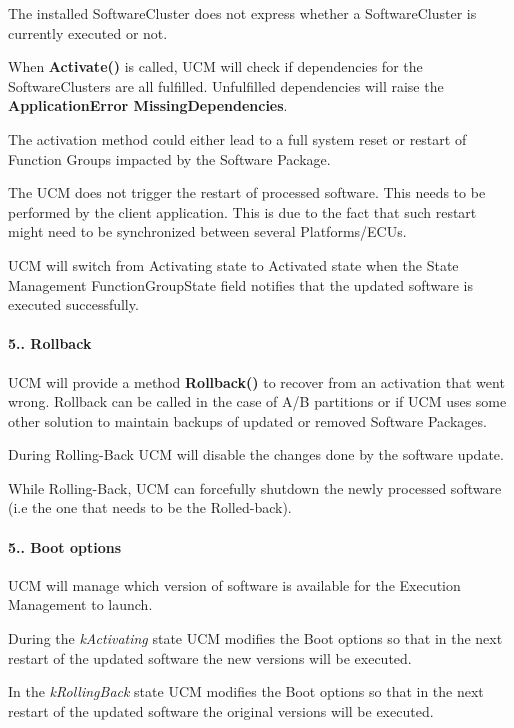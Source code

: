 \begin{DoxyItemize}
\item The installed Software\+Cluster does not express whether a Software\+Cluster is currently executed or not.
\item When {\bfseries Activate()} is called, U\+CM will check if dependencies for the Software\+Clusters are all fulfilled. Unfulfilled dependencies will raise the {\bfseries Application\+Error Missing\+Dependencies}.
\item The activation method could either lead to a full system reset or restart of Function Groups impacted by the Software Package.
\item The U\+CM does not trigger the restart of processed software. This needs to be performed by the client application. This is due to the fact that such restart might need to be synchronized between several Platforms/\+E\+C\+Us.
\item U\+CM will switch from Activating state to Activated state when the State Management Function\+Group\+State field notifies that the updated software is executed successfully.
\end{DoxyItemize}

 \paragraph*{5.. Rollback}


\begin{DoxyItemize}
\item U\+CM will provide a method {\bfseries Rollback()} to recover from an activation that went wrong. Rollback can be called in the case of A/B partitions or if U\+CM uses some other solution to maintain backups of updated or removed Software Packages.
\item During Rolling-\/\+Back U\+CM will disable the changes done by the software update.
\item While Rolling-\/\+Back, U\+CM can forcefully shutdown the newly processed software (i.\+e the one that needs to be the Rolled-\/back).
\end{DoxyItemize}

\paragraph*{5.. Boot options}


\begin{DoxyItemize}
\item U\+CM will manage which version of software is available for the Execution Management to launch.
\item During the {\itshape k\+Activating} state U\+CM modifies the Boot options so that in the next restart of the updated software the new versions will be executed.
\item In the {\itshape k\+Rolling\+Back} state U\+CM modifies the Boot options so that in the next restart of the updated software the original versions will be executed.
\end{DoxyItemize}

